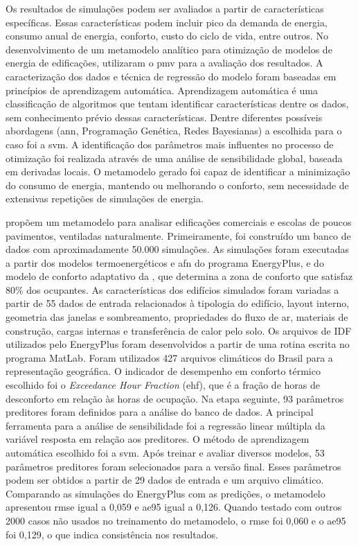 Os resultados de simulações podem ser avaliados a partir de características específicas. Essas características podem incluir pico da demanda de energia, consumo anual de energia, conforto, custo do ciclo de vida, entre outros. No desenvolvimento de um metamodelo analítico para otimização de modelos de energia de edificações,  utilizaram o \acrshort{pmv} para a avaliação dos resultados. A caracterização dos dados e técnica de regressão do modelo foram baseadas em princípios de aprendizagem automática. Aprendizagem automática é uma classificação de algoritmos que tentam identificar características dentre os dados, sem conhecimento prévio dessas características. 
Dentre diferentes possíveis abordagens (\acrshort{ann}, Programação Genética, Redes Bayesianas) a escolhida para o caso foi a \acrshort{svm}. 
A identificação dos parâmetros mais influentes no processo de otimização foi realizada através de uma análise de sensibilidade global, baseada em derivadas locais. O metamodelo gerado foi capaz de identificar a minimização do consumo de energia, mantendo ou melhorando o conforto, sem necessidade de extensivas repetições de simulações de energia.

 propõem um metamodelo para analisar edificações comerciais e escolas de poucos pavimentos, ventiladas naturalmente. Primeiramente, foi construído um banco de dados com aproximadamente 50.000 simulações. As simulações foram executadas a partir dos modelos termoenergéticos e \acrshort{afn} do programa EnergyPlus, e do modelo de conforto adaptativo da  , que determina a zona de conforto que satisfaz 80\% dos ocupantes. As características dos edifícios simulados foram variadas a partir de 55 dados de entrada relacionados à tipologia do edifício, layout interno, geometria das janelas e sombreamento, propriedades do fluxo de ar, materiais de construção, cargas internas e transferência de calor pelo solo. Os arquivos de IDF utilizados pelo EnergyPlus foram desenvolvidos a partir de uma rotina escrita no programa MatLab. Foram utilizados 427 arquivos climáticos do Brasil para a representação geográfica. 
O indicador de desempenho em conforto térmico escolhido foi o \textit{Exceedance Hour Fraction} (\acrshort{ehf}), que é a fração de horas de desconforto em relação às horas de ocupação. Na etapa seguinte, 93 parâmetros preditores foram definidos para a análise do banco de dados. A principal ferramenta para a análise de sensibilidade foi a regressão linear múltipla da variável resposta em relação aos preditores. O método de aprendizagem automática escolhido foi a \acrshort{svm}. Após treinar e avaliar diversos modelos, 53 parâmetros preditores foram selecionados para a versão final. Esses parâmetros podem ser obtidos a partir de 29 dados de entrada e um arquivo climático. Comparando as simulações do EnergyPlus com as predições, o metamodelo apresentou \acrfull{rmse} igual a 0,059 e \acrfull{ae95} igual a 0,126. Quando testado com outros 2000 casos não usados no treinamento do metamodelo, o \acrshort{rmse} foi 0,060 e o \acrshort{ae95} foi 0,129, o que indica consistência nos resultados. 

